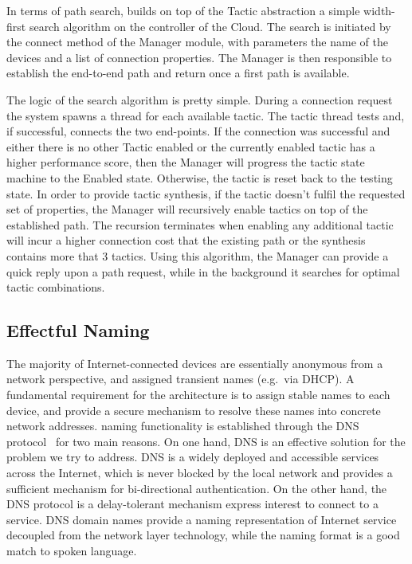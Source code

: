 In terms of path search, \signpost builds on top of the Tactic abstraction a
simple width-first search algorithm on the controller of the \signpost Cloud. The
search is initiated by the connect method of the Manager module, with parameters
the name of the devices and a list of connection properties. The Manager is then
responsible to establish the end-to-end path and return once a first path is
available. 

The logic of the search algorithm is pretty simple. During a connection request
the system spawns a thread for each available tactic. The tactic thread tests
and, if successful, connects the two end-points. If the connection was
successful and either there is no other Tactic enabled or the currently enabled
tactic has a higher performance score, then the Manager will progress the tactic
state machine to the Enabled state. Otherwise, the tactic is reset back to the
testing state. In order to provide tactic synthesis, if the tactic doesn't
fulfil the requested set of properties, the Manager will recursively enable
tactics on top of the established path. The recursion terminates when enabling
any additional tactic will incur a higher connection cost that the existing path
or the synthesis contains more that 3 tactics. Using this algorithm, the Manager
can provide a quick reply upon a path request, while in the background it
searches for optimal tactic combinations. 

\subsection{Effectful Naming} \label{signpost-naming}

The majority of Internet-connected devices are essentially anonymous from a
network perspective, and assigned transient names (e.g.~via DHCP). A fundamental
requirement for the \signpost architecture is to assign stable names to each
device, and provide a secure mechanism to resolve these names into concrete
network addresses.  \signpost naming functionality is established through the
DNS protocol~\cite{RFC1034} for two main reasons. On one hand, DNS is an
effective solution for the problem we try to address. DNS is a widely deployed
and accessible services across the Internet, which is never blocked by the local
network and provides a sufficient mechanism for bi-directional authentication.
On the other hand, the DNS protocol is a delay-tolerant mechanism express
interest to connect to a service. DNS domain names provide a naming
representation of Internet service decoupled from the network layer technology,
while the naming format is a good match to spoken language. 

